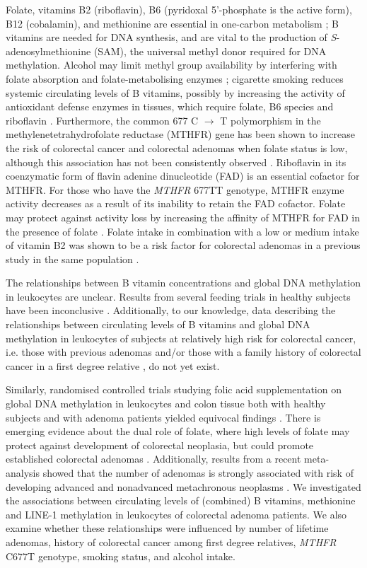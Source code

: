 \noindent Folate, vitamins B2 (riboflavin), B6 (pyridoxal 5'-phosphate is the active form), B12 (cobalamin), and methionine are essential in one-carbon metabolism \cite{c515}; B vitamins are needed for DNA synthesis, and are vital to the production of \emph{S}-adenosylmethionine (SAM), the universal methyl donor required for DNA methylation. Alcohol may limit methyl group availability by interfering with folate absorption and folate-metabolising enzymes \cite{c516}; cigarette smoking reduces systemic circulating levels of B vitamins, possibly by increasing the activity of antioxidant defense enzymes in tissues, which require folate, B6 species and riboflavin \cite{c517}. Furthermore, the common 677 C $\rightarrow$ T polymorphism in the methylenetetrahydrofolate reductase (MTHFR) gene has been shown to increase the risk of colorectal cancer \cite{c518} and colorectal adenomas \cite{c519} when folate status is low, although this association has not been consistently observed \cite{c520,c522}. Riboflavin in its 
coenzymatic form of flavin adenine dinucleotide (FAD) is an essential cofactor for MTHFR. For those who have the \emph{MTHFR} 677TT genotype, MTHFR enzyme activity decreases as a result of its inability to retain the FAD cofactor. Folate may protect against activity loss by increasing the affinity of MTHFR for FAD in the presence of folate \cite{c523, c524}. Folate intake in combination with a low or medium intake of vitamin B2 was shown to be a risk factor for colorectal adenomas in a previous study in the same population \cite{c525}.

\noindent The relationships between B vitamin concentrations and global DNA methylation in leukocytes are unclear. Results from several feeding trials in healthy subjects have been inconclusive \cite{c526,c529}. Additionally, to our knowledge, data describing the relationships between circulating levels of B vitamins and global DNA methylation in leukocytes of subjects at relatively high risk for colorectal cancer, i.e. those with previous adenomas \cite{c530,c531} and/or those with a family history of colorectal cancer in a first degree relative \cite{c532}, do not yet exist.

\noindent Similarly, randomised controlled trials studying folic acid supplementation on global DNA methylation in leukocytes and colon tissue both with healthy subjects and with adenoma patients yielded equivocal findings \cite{c533,c540}. There is emerging evidence about the dual role of folate, where high levels of folate may protect against development of colorectal neoplasia, but could promote established colorectal adenomas \cite{c541,c542}. Additionally, results from a recent meta-analysis showed that the number of adenomas is strongly associated with risk of developing advanced and nonadvanced metachronous neoplasms \cite{c531}. 
We investigated the associations between circulating levels of (combined) B vitamins, methionine and LINE-1 methylation in leukocytes of colorectal adenoma patients. We also examine whether these relationships were influenced by number of lifetime adenomas, history of colorectal cancer among first degree relatives, \emph{MTHFR} C677T genotype, smoking status, and alcohol intake.

